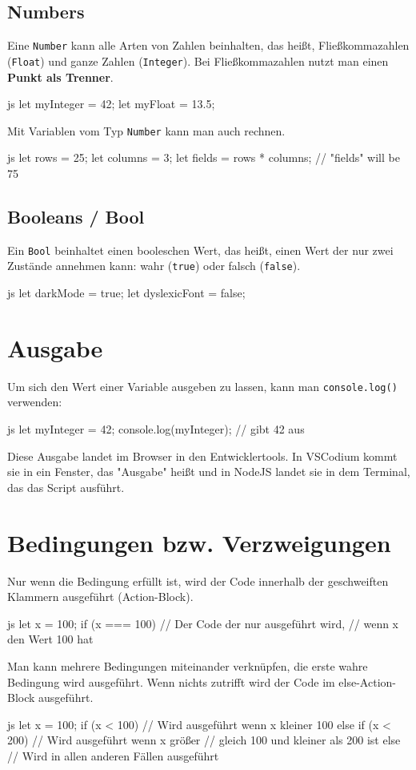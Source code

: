 \documentclass[10pt,a4paper]{article}
\begin{document}
\begin{multicols}{3}
\subsection*{Numbers}
Eine \texttt{Number} kann alle Arten von Zahlen beinhalten, das heißt, Fließkommazahlen (\texttt{Float}) und ganze Zahlen (\texttt{Integer}). Bei Fließkommazahlen nutzt man einen \textbf{Punkt als Trenner}.
\begin{codebox}{js}{}
  let myInteger = 42;
  let myFloat = 13.5;
\end{codebox}
Mit Variablen vom Typ \texttt{Number} kann man auch rechnen.
\begin{codebox}{js}{}
  let rows = 25;
  let columns = 3;
  let fields = rows * columns; // "fields" will be 75
\end{codebox}

\subsection*{Booleans / Bool}
Ein \texttt{Bool} beinhaltet einen booleschen Wert, das heißt, einen Wert der nur zwei Zustände annehmen kann: wahr (\texttt{true}) oder falsch (\texttt{false}).
\begin{codebox}{js}{}
  let darkMode = true;
  let dyslexicFont = false;
\end{codebox}


\section*{Ausgabe}
Um sich den Wert einer Variable ausgeben zu lassen, kann man \texttt{console.log()} verwenden:
\begin{codebox}{js}{}
let myInteger = 42;
console.log(myInteger); // gibt 42 aus
\end{codebox}
Diese Ausgabe landet im Browser in den Entwicklertools. In VSCodium kommt sie in ein Fenster, das "Ausgabe" heißt und in NodeJS landet sie in dem Terminal, das das Script ausführt.


\section*{Bedingungen bzw. Verzweigungen}
Nur wenn die Bedingung erfüllt ist, wird der Code innerhalb der geschweiften Klammern ausgeführt (Action-Block).
\begin{codebox}{js}{}
  let x = 100;
  if (x === 100) {
    // Der Code der nur ausgeführt wird,
    // wenn x den Wert 100 hat
  }
\end{codebox}
Man kann mehrere Bedingungen miteinander verknüpfen, die erste wahre Bedingung wird ausgeführt. Wenn nichts zutrifft wird der Code im else-Action-Block ausgeführt.
\begin{codebox}{js}{}
  let x = 100;
  if (x < 100) {
    // Wird ausgeführt wenn x kleiner 100
  } else if (x < 200) {
    // Wird ausgeführt wenn x größer
    // gleich 100 und kleiner als 200 ist
  } else {
    // Wird in allen anderen Fällen ausgeführt
  }
\end{codebox}



\end{multicols}
\end{document}
